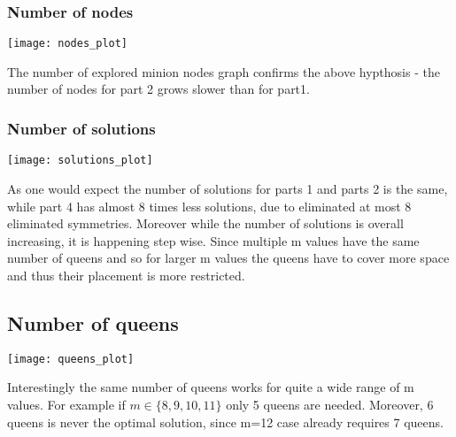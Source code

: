 \documentclass{article}
\begin{document}
\subsubsection{Number of nodes}
\texttt{[image: nodes\_plot]}

The number of explored minion nodes graph confirms the above hypthosis - the number of nodes for part 2 grows slower than for part1.

\subsubsection{Number of solutions}
\texttt{[image: solutions\_plot]}

As one would expect the number of solutions for parts 1 and parts 2 is the same, while part 4 has almost 8 times less solutions, due to eliminated at most 8 eliminated symmetries. Moreover while the number of solutions is overall increasing, it is happening step wise. Since multiple m values have the same number of queens and so for larger m values the queens have to cover more space and thus their placement is more restricted.

\subsection{Number of queens}
\texttt{[image: queens\_plot]}

Interestingly the same number of queens works for quite a wide range of m values. For example if $m\in\{8, 9, 10, 11\}$ only 5 queens are needed. Moreover, 6 queens is never the optimal solution, since m=12 case already requires 7 queens.
\end{document}
